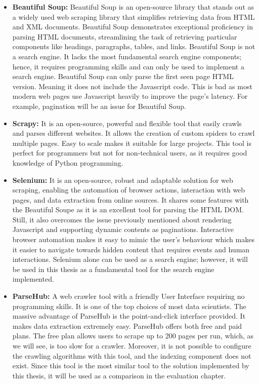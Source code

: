 \begin{itemize}
  \item \textbf{Beautiful Soup:} Beautiful Soup is an open-source library that stands out as a widely used web scraping library that simplifies retrieving data from HTML and XML documents. Beautiful Soup demonstrates exceptional proficiency in parsing HTML documents, streamlining the task of retrieving particular components like headings, paragraphs, tables, and links. Beautiful Soup is not a search engine. It lacks the most fundamental search engine components; hence, it requires programming skills and can only be used to implement a search engine. Beautiful Soup can only parse the first seen page HTML version. Meaning it does not include the Javascript code. This is bad as most modern web pages use Javascript heavily to improve the page's latency. For example, pagination will be an issue for Beautiful Soup.

  \item \textbf{Scrapy:} It is an open-source, powerful and flexible tool that easily crawls and parses different websites. It allows the creation of custom spiders to crawl multiple pages. Easy to scale makes it suitable for large projects. This tool is perfect for programmers but not for non-technical users, as it requires good knowledge of Python programming.

  \item \textbf{Selenium:} It is an open-source, robust and adaptable solution for web scraping, enabling the automation of browser actions, interaction with web pages, and data extraction from online sources. It shares some features with the Beautiful Soupe as it is an excellent tool for parsing the HTML DOM. Still, it also overcomes the issue previously mentioned about rendering Javascript and supporting dynamic contents as paginations. Interactive browser automation makes it easy to mimic the user's behaviour which makes it easier to navigate towards hidden content that requires events and human interactions. Selenium alone can be used as a search engine; however, it will be used in this thesis as a fundamental tool for the search engine implemented.    

  \item \textbf{ParseHub:} A web crawler tool with a friendly User Interface requiring no programming skills. It is one of the top choices of most data scientists. The massive advantage of ParseHub is the point-and-click interface provided. It makes data extraction extremely easy. ParseHub offers both free and paid plans. The free plan allows users to scrape up to 200 pages per run, which, as we will see, is too slow for a crawler. Moreover, it is not possible to configure the crawling algorithms with this tool, and the indexing component does not exist. Since this tool is the most similar tool to the solution implemented by this thesis, it will be used as a comparison in the evaluation chapter. 
\end{itemize}

